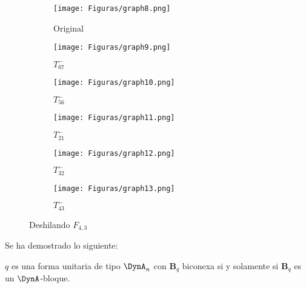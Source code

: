 \begin{figure}[h]
    \begin{subfigure}[b]{0.3\textwidth}
      \begin{minipage}{7cm}
	\centering%
	    \texttt{[image: Figuras/graph8.png]}
	 \end{minipage}
	\caption{Original}
     \end{subfigure}
     \begin{subfigure}[b]{0.3\textwidth}
        \begin{minipage}{7cm}
       	 \centering%
	    \texttt{[image: Figuras/graph9.png]}
        \end{minipage}
        \caption{$T_{6 7}^{-}$}
     \end{subfigure}
     \begin{subfigure}[b]{0.3\textwidth}
        \begin{minipage}{7cm}
       	 \centering%
	    \texttt{[image: Figuras/graph10.png]}
        \end{minipage}
        \caption{$T_{5 6}^{-}$}
     \end{subfigure}
      \begin{subfigure}[b]{0.3\textwidth}
      \begin{minipage}{7cm}
	\centering%
	    \texttt{[image: Figuras/graph11.png]}
	 \end{minipage}
	\caption{$T_{2 1}^{-}$}
     \end{subfigure}
     \begin{subfigure}[b]{0.3\textwidth}
        \begin{minipage}{7cm}
       	 \centering%
	    \texttt{[image: Figuras/graph12.png]}
        \end{minipage}
        \caption{$T_{3 2}^{-}$}
     \end{subfigure}
     \begin{subfigure}[b]{0.3\textwidth}
        \begin{minipage}{7cm}
       	 \centering%
	    \texttt{[image: Figuras/graph13.png]}
        \end{minipage}
        \caption{$T_{4 3}^{-}$}
     \end{subfigure}
     \caption{Deshilando $F_{4, 3}$}
    \label{figura:2.6}
\end{figure}
Se ha demostrado lo siguiente:
\begin{lemma}
$q$ es una forma unitaria de tipo $\DynA_{n}$ con $\textbf{B}_{q}$ biconexa si y solamente si $\textbf{B}_{q}$ es un $\DynA$-bloque.
\label{lemma:2.9}
\end{lemma}

